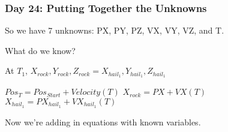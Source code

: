 \begin{frame}
\frametitle{Day 24: Putting Together the Unknowns}
    
So we have 7 unknowns: PX, PY, PZ, VX, VY, VZ, and T.\vfill

What do we know?\vfill

At $T_1$, $X_{rock}, Y_{rock}, Z_{rock} = X_{hail_1}, Y_{hail_1}, Z_{hail_1}$\vfill

$Pos_T = Pos_{Start} + Velocity(T)$\linebreak
$X_{rock} = PX + VX(T)$\linebreak
$X_{hail_1} = PX_{hail_1} + VX_{hail_1}(T)$\vfill

Now we're adding in equations with known variables.

\end{frame}